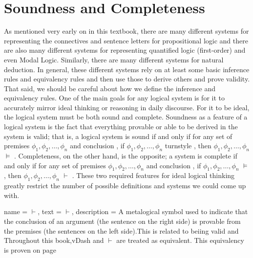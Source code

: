 \label{ch.soundnesscompletenesspl}
\chapter{Soundness and Completeness}
As mentioned very early on in this textbook, there are many different systems for representing the connectives and sentence letters for propositional logic and there are also many different systems for representing quantified logic (first-order) and even Modal Logic. Similarly, there are many different systems for natural deduction. In general, these different systems rely on at least some basic inference rules and equivalency rules and then use those to derive others and prove validity. That said, we should be careful about how we define the inference and equivalency rules. One of the main goals for any logical system is for it to accurately mirror ideal thinking or reasoning in daily discourse. For it to be ideal, the logical system must be both sound and complete. Soundness as a feature of a logical system is the fact that everything provable or able to be derived in the system is valid; that is, a logical system  is sound if and only if for any set of premises $\phi_1,\phi_2,\ldots,\phi_n$ and conclusion , if $\phi_1,\phi_2,\ldots,\phi_n$ \gls{turnstyle} , then $\phi_1,\phi_2,\ldots,\phi_n$ $\vDash$ . Completeness, on the other hand, is the opposite; a system  is complete if and only if for any set of premises $\phi_1,\phi_2,\ldots,\phi_n$ and conclusion , if $\phi_1,\phi_2,\ldots,\phi_n$ $\vDash$ , then $\phi_1,\phi_2,\ldots,\phi_n$ $\vdash$ . These two required features for ideal logical thinking greatly restrict the number of possible definitions and systems we could come up with. 

{
name = {\ensuremath{\vdash}},
text = $\vdash$,
description = {A metalogical symbol used to indicate that the conclusion of an argument (the sentence on the right side) is provable from the premises (the sentences on the left side).This is related to beiing \gls{valid} and Throughout this book,\gls{vDash} and $\vdash$ are treated as equivalent. This equivalency is proven on page \pageref{ch.soundnesscompletenesspl}}
} 



